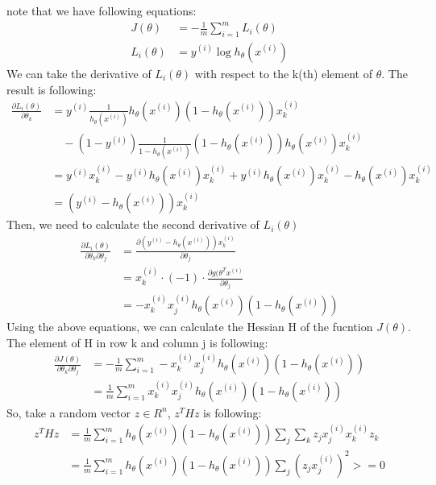 \begin{answer}
note that we have following equations:
\begin{align*}
J(\theta) &= - \frac{1}{m} \sum \limits_{i=1}^m L_i(\theta)\\
L_i(\theta) &= y^{(i)}\log h_\theta(x^{(i)})
\end{align*}
We can take the derivative of $L_i(\theta)$ with respect to the k(th) element of $\theta$. The result is following:
\begin{align*}
\frac{\partial L_i(\theta)}{\partial \theta_k} &= y^{(i)}\frac{1}{h_\theta(x^{(i)})}h_\theta(x^{(i)})(1-h_\theta(x^{(i)}))x^{(i)}_k\\&\quad-(1-y^{(i)})\frac{1}{1-h_\theta(x^{(i)})}(1-h_\theta(x^{(i)}))h_\theta(x^{(i)})x^{(i)}_k\\
&=y^{(i)}x^{(i)}_k - y^{(i)}h_\theta(x^{(i)})x^{(i)}_k+y^{(i)}h_\theta(x^{(i)})x^{(i)}_k-h_\theta(x^{(i)})x^{(i)}_k\\
&=(y^{(i)}-h_\theta(x^{(i)}))x^{(i)}_k
\end{align*}
Then, we need to calculate the second derivative of $L_i(\theta)$
\begin{align*}
    \frac{\partial L_i(\theta)}{\partial \theta_k \partial \theta_j} &= \frac{\partial (y^{(i)}-h_\theta(x^{(i)}))x^{(i)}_k}{\partial \theta_j}\\
    &=x^{(i)}_k\cdot(-1)\cdot \frac{\partial g(\theta^T x^{(i)}}{\partial \theta_j}\\
    &=-x^{(i)}_k x^{(i)}_j h_\theta(x^{(i)}) (1 - h_\theta(x^{(i)}))
\end{align*}
Using the above equations, we can calculate the Hessian H of the fucntion $J(\theta)$. The element of H in row k and column j is following:
\begin{align*}
    \frac{\partial J(\theta)}{\partial \theta_k \partial \theta_j} &= - \frac{1}{m}\sum\limits_{i=1}^m -x^{(i)}_k x^{(i)}_j h_\theta(x^{(i)}) (1 - h_\theta(x^{(i)}))\\
    &= \frac{1}{m}\sum\limits_{i=1}^m x^{(i)}_k x^{(i)}_j h_\theta(x^{(i)}) (1 - h_\theta(x^{(i)}))
\end{align*}
So, take a random vector $z \in R^n$, $z^T H z$ is following:
\begin{align*}
    z^T H z &= \frac{1}{m}\sum\limits_{i=1}^m h_\theta(x^{(i)}) (1 - h_\theta(x^{(i)})) \sum\limits_j \sum\limits_k z_j x^{(i)}_j x^{(i)}_k z_k\\
    &= \frac{1}{m}\sum\limits_{i=1}^m h_\theta(x^{(i)}) (1 - h_\theta(x^{(i)})) \sum\limits_j (z_j x^{(i)}_j)^2 >= 0
\end{align*}
\end{answer}
